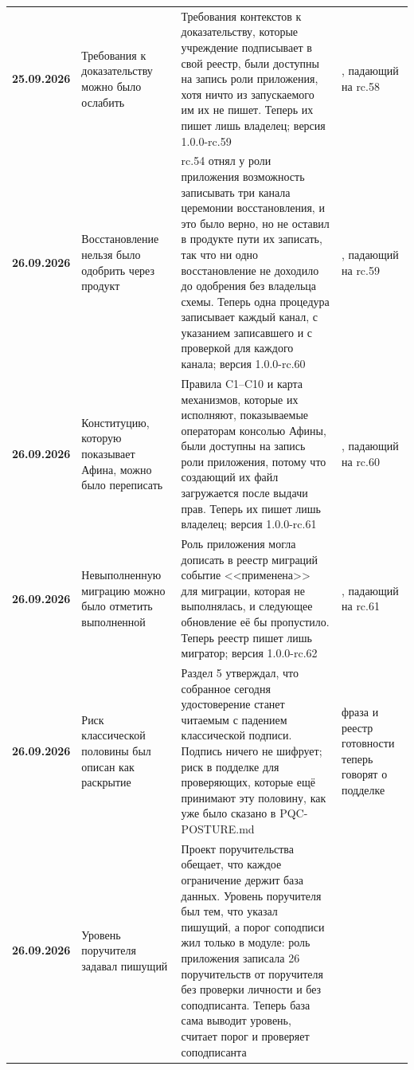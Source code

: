 {\begin{xltabular}{\textwidth}{>{\bfseries\hspace{0pt}}p{0.74in} >{\RaggedRight\arraybackslash\hspace{0pt}}X >{\RaggedRight\arraybackslash\hspace{0pt}}X >{\RaggedRight\arraybackslash\hspace{0pt}}p{1.6in}}
25.09.2026 & Требования к доказательству можно было ослабить & Требования контекстов к доказательству, которые учреждение подписывает в свой реестр, были доступны на запись роли приложения, хотя ничто из запускаемого им их не пишет. Теперь их пишет лишь владелец; версия 1.0.0-rc.59 & , падающий на rc.58 \\
26.09.2026 & Восстановление нельзя было одобрить через продукт & rc.54 отнял у роли приложения возможность записывать три канала церемонии восстановления, и это было верно, но не оставил в продукте пути их записать, так что ни одно восстановление не доходило до одобрения без владельца схемы. Теперь одна процедура записывает каждый канал, с указанием записавшего и с проверкой для каждого канала; версия 1.0.0-rc.60 & , падающий на rc.59 \\
26.09.2026 & Конституцию, которую показывает Афина, можно было переписать & Правила C1--C10 и карта механизмов, которые их исполняют, показываемые операторам консолью Афины, были доступны на запись роли приложения, потому что создающий их файл загружается после выдачи прав. Теперь их пишет лишь владелец; версия 1.0.0-rc.61 & , падающий на rc.60 \\
26.09.2026 & Невыполненную миграцию можно было отметить выполненной & Роль приложения могла дописать в реестр миграций событие <<применена>> для миграции, которая не выполнялась, и следующее обновление её бы пропустило. Теперь реестр пишет лишь мигратор; версия 1.0.0-rc.62 & , падающий на rc.61 \\
26.09.2026 & Риск классической половины был описан как раскрытие & Раздел 5 утверждал, что собранное сегодня удостоверение станет читаемым с падением классической подписи. Подпись ничего не шифрует; риск в подделке для проверяющих, которые ещё принимают эту половину, как уже было сказано в PQC-POSTURE.md & фраза и реестр готовности теперь говорят о подделке \\
26.09.2026 & Уровень поручителя задавал пишущий & Проект поручительства обещает, что каждое ограничение держит база данных. Уровень поручителя был тем, что указал пишущий, а порог соподписи жил только в модуле: роль приложения записала 26 поручительств от поручителя без проверки личности и без соподписанта. Теперь база сама выводит уровень, считает порог и проверяет соподписанта &  \\
\end{xltabular}
}

